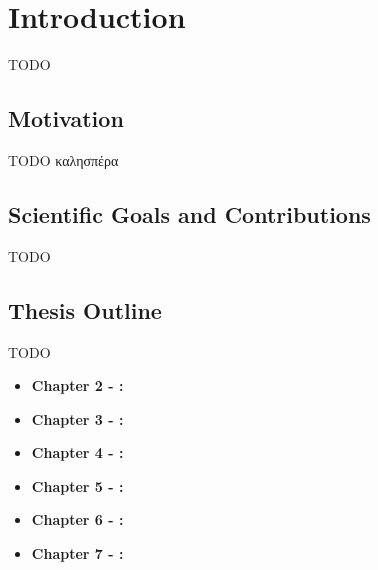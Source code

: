 \chapter{Introduction} %
\label{chap:Chapter1}       %

TODO

\section{Motivation}
\label{sec:Chapter1-1} 

TODO
καλησπέρα

\section{Scientific Goals and Contributions}
\label{sec:Chapter1-2} 

TODO

\section{Thesis Outline}
\label{sec:Chapter1-3} 

    TODO
    \begin{itemize}
        \item \textbf{Chapter 2 - {\hypersetup{hidelinks}}:}
        \item \textbf{Chapter 3 - {\hypersetup{hidelinks}}:}
        \item \textbf{Chapter 4 - {\hypersetup{hidelinks}}:}                %
        \item \textbf{Chapter 5 - {\hypersetup{hidelinks}}:}       %
        \item \textbf{Chapter 6 - {\hypersetup{hidelinks}}:}
        \item \textbf{Chapter 7 - {\hypersetup{hidelinks}}:}
    \end{itemize}
